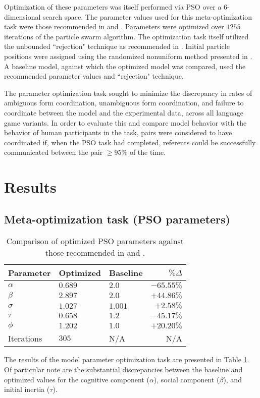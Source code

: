 \documentclass[11pt]{article}
\begin{document}
Optimization of these parameters was itself performed via PSO over a $6$-dimensional search space. The parameter values used for this meta-optimization task were those recommended in \cite{shi1998} and \cite{solnon2010}. Parameters were optimized over $1255$ iterations of the particle swarm algorithm. The optimization task itself utilized the unbounded ``rejection" technique as recommended in \cite{engelbrecht2005}. Initial particle positions were assigned using the randomized nonuniform method presented in \cite{mitchell1991}. A baseline model, against which the optimized model was compared, used the recommended parameter values and ``rejection" technique. 

The parameter optimization task sought to minimize the discrepancy in rates of ambiguous form coordination, unambiguous form coordination, and failure to coordinate between the model and the experimental data, across all language game variants. In order to evaluate this and compare model behavior with the behavior of human participants in the task, pairs were considered to have coordinated if, when the PSO task had completed, referents could be successfully communicated between the pair $\geq 95\%$ of the time.


\section{Results}
\subsection{Meta-optimization task (PSO parameters)}
\label{sec:parameter_optimization}
\begin{table}[t]
\begin{center}
    \begin{tabular}{ l l l r }
    Parameter & Optimized & Baseline & $\% \Delta$ \\ \hline
    $\alpha$      & $0.689$ & $2.0$   & $-65.55\%$ \\ \hline
    $\beta$         & $2.897$ & $2.0$   & $+44.86\%$ \\ \hline
    $\sigma$ & $1.027$ & $1.001$ & $+2.58\%$\\ \hline
    $\tau$             & $0.658$ & $1.2$   & $-45.17\%$ \\ \hline
    $\phi$   & $1.202$ & $1.0$   & $+20.20\%$\\ \hline
    Iterations                           & $305$   & N/A     & N/A\\ 
    \end{tabular}
   	\caption{Comparison of optimized PSO parameters against those recommended in \cite{shi1998} and \cite{solnon2010}.}
	\label{table:1}
\end{center}
\end{table}
The results of the model parameter optimization task are presented in Table \ref{table:1}. Of particular note are the substantial discrepancies between the baseline and optimized values for the cognitive component ($\alpha$), social component ($\beta$), and initial inertia ($\tau$).
\end{document}
